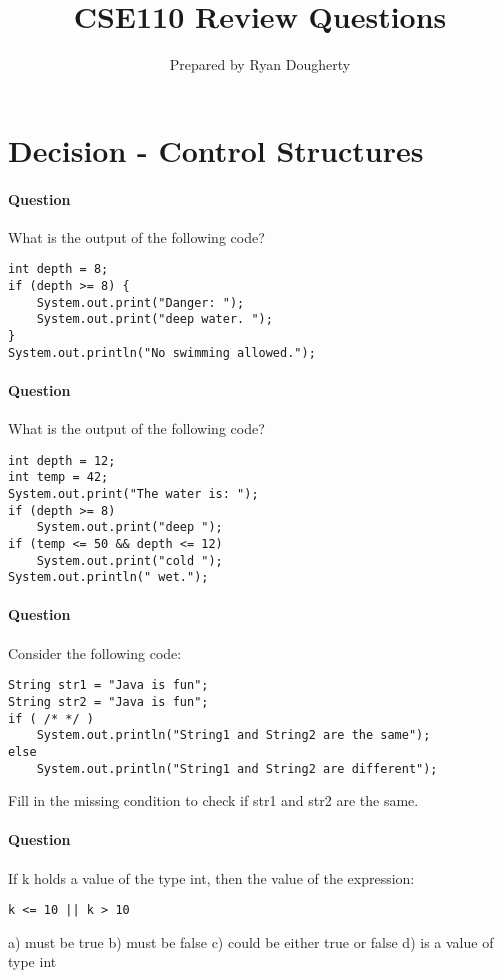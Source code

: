 \documentclass{article}
\title{CSE110 Review Questions}
\author{Prepared by Ryan Dougherty}
\date{}
\begin{document}
\maketitle

\section{Decision - Control Structures}


\setcounter{question_num}{1}
\paragraph{Question }
What is the output of the following code?
\begin{lstlisting}
int depth = 8;
if (depth >= 8) {
	System.out.print("Danger: ");
	System.out.print("deep water. ");
}
System.out.println("No swimming allowed.");
\end{lstlisting}


\addtocounter{question_num}{1}
\paragraph{Question }
What is the output of the following code?
\begin{lstlisting}
int depth = 12;
int temp = 42;
System.out.print("The water is: ");
if (depth >= 8)
	System.out.print("deep ");
if (temp <= 50 && depth <= 12)
	System.out.print("cold ");
System.out.println(" wet.");
\end{lstlisting}

\addtocounter{question_num}{1}
\paragraph{Question }
Consider the following code:
\begin{lstlisting}
String str1 = "Java is fun";
String str2 = "Java is fun";
if ( /* */ )
	System.out.println("String1 and String2 are the same");
else
	System.out.println("String1 and String2 are different");
\end{lstlisting}
Fill in the missing condition to check if str1 and str2 are the same.

\addtocounter{question_num}{1}
\paragraph{Question }
If k holds a value of the type int, then the value of the expression:
\begin{lstlisting}
k <= 10 || k > 10
\end{lstlisting}
a) must be true
\newline b) must be false
\newline c) could be either true or false
\newline d) is a value of type int
\end{document}
